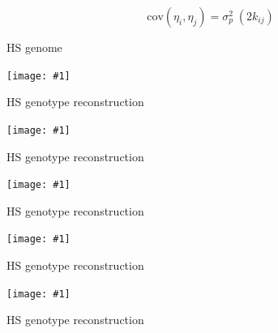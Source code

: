 \documentclass[12pt]{article}
\newcommand{\headsize}{\fontsize{35}{35} \selectfont}
\newcommand{\figh}[2]{\centerline{\texttt{[image: \#1]}}}
\begin{document}
$$\text{cov}(\eta_i, \eta_j) = \sigma^2_p \; (2 k_{ij})$$






\newpage

\headsize \color{myyellow}
\hfill\begin{minipage}{5.75in}
\centering
HS genome
\end{minipage}

\vspace{5mm}

\figh{Figs/do_genome.pdf}{0.9}


\newpage

\headsize \color{myyellow}
\hfill\begin{minipage}{6.75in}
\centering
HS genotype reconstruction
\end{minipage}

\vspace{5mm}

\figh{Figs/genoprobsA.pdf}{0.9}


\newpage

\headsize \color{myyellow}
\hfill\begin{minipage}{6.75in}
\centering
HS genotype reconstruction
\end{minipage}

\vspace{5mm}

\figh{Figs/genoprobsB.pdf}{0.9}


\newpage

\headsize \color{myyellow}
\hfill\begin{minipage}{6.75in}
\centering
HS genotype reconstruction
\end{minipage}

\vspace{5mm}

\figh{Figs/genoprobsC.pdf}{0.9}


\newpage

\headsize \color{myyellow}
\hfill\begin{minipage}{6.75in}
\centering
HS genotype reconstruction
\end{minipage}

\vspace{5mm}

\figh{Figs/genoprobsD.pdf}{0.9}


\newpage

\headsize \color{myyellow}
\hfill\begin{minipage}{6.75in}
\centering
HS genotype reconstruction
\end{minipage}
\end{document}

